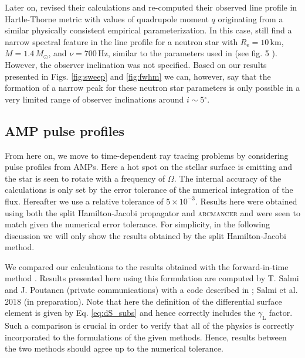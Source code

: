 \documentclass{aa}
\newcommand{\refe}[1]{#1}
\newcommand{\refedel}[1]{}
\newcommand{\Msun}{\ensuremath{M_{\odot}}}
\newcommand{\lgamma}{\gamma_{\text{L}}}
\renewcommand{\deg}{\ensuremath{^{\circ}}}
\begin{document}
\refe{
Later on, \citet{BBP13} revised their calculations and re-computed their observed line profile in Hartle-Thorne metric with values of quadrupole moment $q$ originating from a similar physically consistent empirical parameterization.
In this case, \citet{BBP13} still find a narrow spectral feature in the line profile for a neutron star with $R_{\mathrm{e}} = 10\,\mathrm{km}$, $M=1.4\,\Msun$, and $\nu = 700\,\mathrm{Hz}$, similar to the parameters used in \citet{BPO13} (see fig. 5 \citealt{BBP13}).
However, the observer inclination was not specified.
Based on our results presented in Figs. \ref{fig:sweep} and \ref{fig:fwhm} we can, however, say that the formation of a narrow peak for these neutron star parameters is only possible in a very limited range of observer inclinations around $i \sim 5\deg$.
}




\subsection{AMP pulse profiles}\label{sect:AMPs}

From here on, we move to time-dependent ray tracing problems by considering pulse profiles from AMPs.
Here a hot spot \refedel{on top of} \refe{on the stellar} surface is emitting and the star is seen to rotate with a frequency of $\Omega$.
\refe{The internal accuracy of the calculations is only set by the error tolerance of the numerical integration of the flux.
Hereafter we use a relative tolerance of $5 \times 10^{-3}$.
Results here were obtained using both the split Hamilton-Jacobi propagator and \textsc{arcmancer} and were seen to match given the numerical error tolerance.
For simplicity, in the following discussion we will only show the results obtained by the split Hamilton-Jacobi method.
}

\refe{
We compared our calculations to the results obtained with the forward-in-time method \citep[see e.g.,][]{PB06, MLCB07}.
Results presented here using this formulation are computed by T. Salmi and J. Poutanen (private communications) with a code described in \citet{PB06}; Salmi et al. 2018 (in preparation).
Note that here the definition of the differential surface element is given by Eq. \eqref{eq:dS_subs} and hence correctly includes the $\lgamma$ factor.
Such a comparison is crucial in order to verify that all of the physics is correctly incorporated to the formulations of the given methods.
Hence, results between the two methods should agree up to the numerical tolerance.
}
\end{document}
